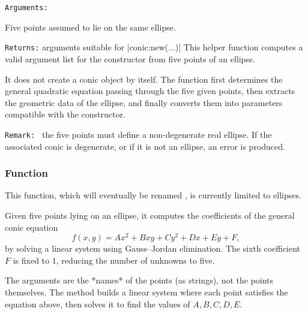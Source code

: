 \texttt{Arguments: }

Five points assumed to lie on the same ellipse.


\medskip
\texttt{Returns:} arguments suitable for  |conic:new(...)|
This helper function computes a valid argument list for the constructor
 from five points of an ellipse.

It does not create a conic object by itself. The function first determines
the general quadratic equation passing through the five given points, then
extracts the geometric data of the ellipse, and finally converts them into
parameters compatible with the constructor.


\medskip

\texttt{Remark: } the five points must define a non-degenerate real ellipse.
If the associated conic is degenerate, or if it is not an ellipse, an error is produced.

\begin{tkzexample}[latex= .4\textwidth]
\begin{center}
\end{center}
\end{tkzexample}


\subsubsection{Function }
\label{ssub:search_ellipse}

This function, which will eventually be renamed , is currently limited to ellipses.

Given five points lying on an ellipse, it computes the coefficients of the general conic equation
\[
f(x, y) = Ax^2 + Bxy + Cy^2 + Dx + Ey + F,
\]
by solving a linear system using Gauss–Jordan elimination.
The sixth coefficient \( F \) is fixed to \( 1 \), reducing the number of unknowns to five.

The arguments are the *names* of the points (as strings), not the points themselves. The method builds a linear system where each point satisfies the equation above, then solves it to find the values of \( A, B, C, D, E \).

